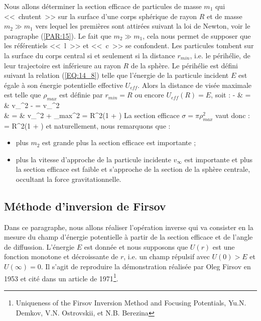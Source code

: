 Nous allons d\'eterminer la section efficace de particules de masse $m_{1}$ qui <<~chutent~>> sur la surface d'une corps sph\'erique de rayon $R$ et de masse $m_{2} \gg m_{1}$ vers lequel les premi\`eres sont attir\'ees suivant la loi de Newton, voir le paragraphe (\ref{PAR:15}). Le fait que $m_{2} \gg m_{1}$, cela nous permet de supposer que les r\'ef\'erentiels <<~l~>> et <<~c~>> se confondent. Les particules tombent sur la surface du corps central si et seulement si la distance $r_{min}$, i.e. le p\'erih\'elie, de leur trajectoire est inf\'erieure au rayon $R$ de la sph\`ere. Le p\'erih\'elie est d\'efini suivant la relation (\ref{EQ:14_8}) telle que l'\'energie de la particule incident $E$ est \'egale à son \'energie potentielle effective $U_{eff}$. Alors la distance de vis\'ee maximale est telle que $\rho_{max}$ est d\'efinie par $r_{min} = R$ ou encore $U_{eff}(R) = E$, soit :
\bea
	 -  & = & v_{\infty}^{2} \Leftrightarrow {} -  = v_{\infty}^{2} \nonumber \\
	\Leftrightarrow {} & = & v_{\infty}^{2} +  \Leftrightarrow \rho_{max}^{2} = R^{2}\left(1 + \right) \nonumber
\eea
La section efficace $\sigma = \pi\rho_{max}^{2}$ vaut donc :
\benn
	\sigma = \pi R^{2}\left(1 + \right)
\eenn
et naturellement, nous remarquons que :
\begin{itemize}
	\item plus $m_{2}$ est grande plus la section efficace est importante ;
	\item plus la vitesse d'approche de la particule incidente $v_{\infty}$ est importante et plus la section efficace est faible et s'approche de la section de la sph\`ere centrale, occultant la force gravitationnelle.
\end{itemize}

\subsection{M\'ethode d'inversion de Firsov}

Dans ce paragraphe, nous allons r\'ealiser l'op\'eration inverse qui va consister en la mesure du champ d'\'energie potentielle \`a partir de la section efficace et de l'angle de diffussion. L'\'energie $E$ est donn\'ee et nous supposons que $U(r)$ est une fonction monotone et d\'ecroissante de $r$, i.e. un champ r\'epulsif avec $U(0) > E$ et $U(\infty) = 0$. Il s'agit de reproduire la d\'emonstration r\'ealis\'ee par Oleg Firsov en 1953 et cit\'e dans un article de 1971\footnote{Uniqueness of the Firsov Inversion Method and Focusing Potentials, Yu.N. Demkov, V.N. Ostrovskii, et N.B. Berezina}.

